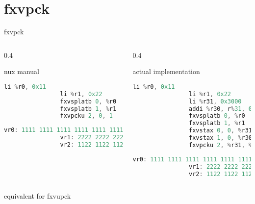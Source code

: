 \documentclass[10pt]{beamer}
\begin{document}
\section{fxvpck}
\begin{frame}[fragile]{fxvpck}{}
	\begin{columns}[t]
		\begin{column}{0.4\textwidth}
			\begin{block}{nux manual}
			\begin{lstlisting}[language=C++,basicstyle=\ttfamily\scriptsize,keywordstyle=\color{red}]
				li %r0, 0x11
				li %r1, 0x22
				fxvsplatb 0, %r0
				fxvsplatb 1, %r1
				fxvpcku 2, 0, 1
			\end{lstlisting}
      		\begin{lstlisting}[language=C++,basicstyle=\fontsize{5}{7}\selectfont\ttfamily,keywordstyle=\color{red}]
				vr0: 1111 1111 1111 1111 1111 1111 1111 1111
				vr1: 2222 2222 2222 2222 2222 2222 2222 2222
				vr2: 1122 1122 1122 1122 1122 1122 1122 1122
			\end{lstlisting}
			\end{block}
    	\end{column}
    	\begin{column}{0.4\textwidth}
    		\begin{block}{actual implementation}
    		\begin{lstlisting}[language=C++,basicstyle=\ttfamily\scriptsize,keywordstyle=\color{red}]
				li %r0, 0x11
				li %r1, 0x22
				li %r31, 0x3000
				addi %r30, r%31, 0x10
				fxvsplatb 0, %r0
				fxvsplatb 1, %r1
				fxvstax 0, 0, %r31
				fxvstax 1, 0, %r30
				fxvpcku 2, %r31, %r30
			\end{lstlisting}
      		\begin{lstlisting}[language=C++,basicstyle=\fontsize{5}{7}\selectfont\ttfamily,keywordstyle=\color{red}]
				vr0: 1111 1111 1111 1111 1111 1111 1111 1111
				vr1: 2222 2222 2222 2222 2222 2222 2222 2222
				vr2: 1122 1122 1122 1122 1122 1122 1122 1122
			\end{lstlisting}
			\end{block}
    	\end{column}
	\end{columns}
	equivalent for fxvupck
\end{frame}
\end{document}
